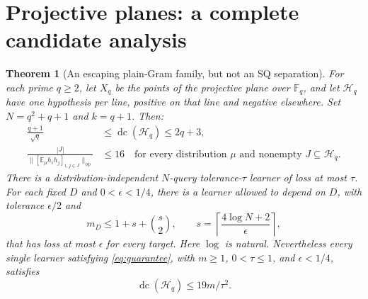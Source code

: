 \documentclass[11pt]{article}
\newtheorem{theorem}{Theorem}
\DeclareMathOperator{\dc}{dc}
\newcommand{\E}{\mathbb E}
\newcommand{\1}{\mathbf 1}
\newcommand{\cH}{\mathcal H}
\newcommand{\op}{\mathrm{op}}
\begin{document}
\section{Projective planes: a complete candidate analysis}
\begin{theorem}[An escaping plain-Gram family, but not an SQ separation]\label{thm:plane}
For each prime $q\geq2$, let $X_q$ be the points of the projective plane over $\mathbb F_q$, and let $\cH_q$ have one hypothesis per line, positive on that line and negative elsewhere. Set $N=q^2+q+1$ and $k=q+1$. Then:
\begin{align}
 \frac{q+1}{\sqrt q}&\leq\dc(\cH_q)\leq2q+3,\label{eq:planedc}\\
 \frac{|J|}{\|[\E_\mu h_i h_j]_{i,j\in J}\|_\op}&\leq16
 \quad\text{for every distribution $\mu$ and nonempty $J\subseteq\cH_q$}.
 \label{eq:planeplain}
\end{align}
There is a distribution-independent $N$-query tolerance-$\tau$ learner of loss at most $\tau$. For each \emph{fixed} $D$ and $0<\epsilon<1/4$, there is a learner allowed to depend on $D$, with tolerance $\epsilon/2$ and
\[
 m_D\leq1+s+\binom{s}{2},\qquad
 s=\left\lceil\frac{4\log N+2}{\epsilon}\right\rceil,
\]
that has loss at most $\epsilon$ for every target. Here $\log$ is natural.
Nevertheless every \emph{single} learner satisfying \eqref{eq:guarantee}, with $m\geq1$, $0<\tau\leq1$, and $\epsilon<1/4$, satisfies
\begin{equation}\label{eq:plane19}
 \dc(\cH_q)\leq19m/\tau^2.
\end{equation}
\end{theorem}
\end{document}
